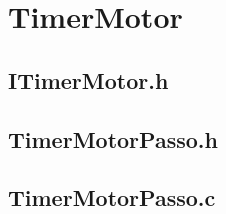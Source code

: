 \chapter{TimerMotor}

\section{ITimerMotor.h}


	
\section{TimerMotorPasso.h}



\section{TimerMotorPasso.c}

